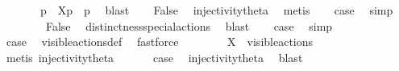 \begin{isabellebody}
\ {}\isanewline
\ \ \isamarkupfalse%
\ \isamarkupfalse%
\ p{\isacharprime}{\kern0pt}\ \ {\isacartoucheopen}{\isasymtheta}{\isacharbrackleft}{\kern0pt}X{\isacharbrackright}{\kern0pt}{\isacharparenleft}{\kern0pt}p{\isacharparenright}{\kern0pt}\ {\isacharequal}{\kern0pt}\ {\isasymtheta}{\isacharparenleft}{\kern0pt}p{\isacharprime}{\kern0pt}{\isacharparenright}{\kern0pt}{\isacartoucheclose}\ \isamarkupfalse%
\ blast\isanewline
\ \ \isamarkupfalse%
\ False\ \isamarkupfalse%
\ injectivity{\isacharunderscore}{\kern0pt}theta{\isacharparenleft}{\kern0pt}{}{\isacharparenright}{\kern0pt}\ \isamarkupfalse%
\ metis\isanewline
\ \ \isamarkupfalse%
\ {\isacharquery}{\kern0pt}case\ \isamarkupfalse%
\ simp\isanewline
{}\isamarkupfalse%
\isanewline
\ \ \isamarkupfalse%
\ {}\isanewline
\ \ \isamarkupfalse%
\ False\ \isamarkupfalse%
\ distinctness{\isacharunderscore}{\kern0pt}special{\isacharunderscore}{\kern0pt}actions\ \isamarkupfalse%
\ blast\isanewline
\ \ \isamarkupfalse%
\ {\isacharquery}{\kern0pt}case\ \isamarkupfalse%
\ simp\isanewline
{}\isamarkupfalse%
\isanewline
\ \ \isamarkupfalse%
\ {}\isanewline
\ \ \isamarkupfalse%
\ \isamarkupfalse%
\ {\isacharquery}{\kern0pt}case\ \isamarkupfalse%
\ visible{\isacharunderscore}{\kern0pt}actions{\isacharunderscore}{\kern0pt}def\ \isamarkupfalse%
\ fastforce\isanewline
{}\isamarkupfalse%
\isanewline
\ \ \isamarkupfalse%
\ {}\isanewline
\ \ \isamarkupfalse%
\ {\isacartoucheopen}X\ {\isasymsubseteq}\ visible{\isacharunderscore}{\kern0pt}actions{\isacartoucheclose}\ \isamarkupfalse%
\ {\isacharparenleft}{\kern0pt}metis\ injectivity{\isacharunderscore}{\kern0pt}theta{\isacharparenleft}{\kern0pt}{}{\isacharparenright}{\kern0pt}{\isacharparenright}{\kern0pt}\isanewline
\ \ \isamarkupfalse%
\ {}\ \isamarkupfalse%
\ {\isacharquery}{\kern0pt}case\ \isamarkupfalse%
\ injectivity{\isacharunderscore}{\kern0pt}theta{\isacharparenleft}{\kern0pt}{}{\isacharparenright}{\kern0pt}\ \isamarkupfalse%
\ blast\isanewline
{}\isamarkupfalse%
\isanewline

\end{isabellebody}
